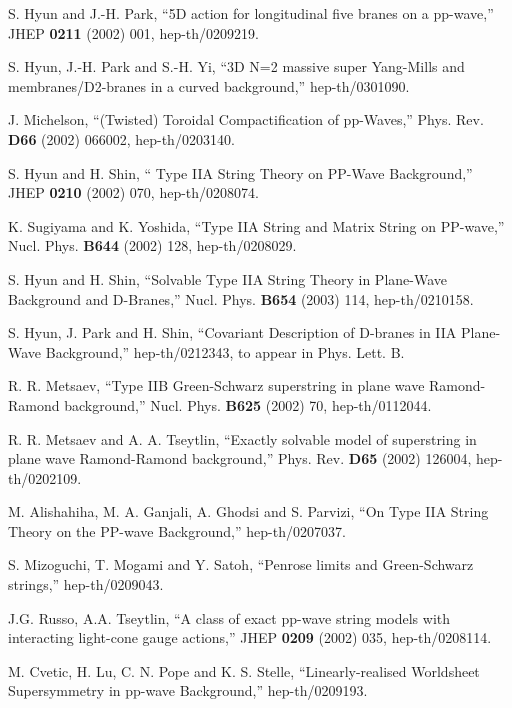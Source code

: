 \documentclass[a4paper,12pt]{article}
\numberwithin{equation}{section}
\begin{document}
\begin{thebibliography}{99}
 S. Hyun and J.-H. Park, ``5D action for longitudinal
  five branes on a pp-wave,'' JHEP {\bf 0211} (2002) 001,
  hep-th/0209219.

 S. Hyun, J.-H. Park and S.-H. Yi, ``3D N=2 massive
  super Yang-Mills and membranes/D2-branes in a curved background,''
  hep-th/0301090.

 J. Michelson, ``(Twisted) Toroidal Compactification
  of pp-Waves,'' Phys. Rev. {\bf D66} (2002) 066002, hep-th/0203140.

 S. Hyun and H. Shin, ``\coordHE{} Type IIA
  String Theory on PP-Wave Background,'' JHEP {\bf 0210} (2002) 070,
  hep-th/0208074.

 K. Sugiyama and K. Yoshida, ``Type IIA String and
  Matrix String on PP-wave,'' Nucl. Phys. {\bf B644} (2002) 128,
  hep-th/0208029.

 S. Hyun and H. Shin, ``Solvable \coordHE{} Type
  IIA String Theory in Plane-Wave Background and D-Branes,'' Nucl.
  Phys.  {\bf B654} (2003) 114, hep-th/0210158.

 S. Hyun, J. Park and H. Shin, ``Covariant Description
  of D-branes in IIA Plane-Wave Background,'' hep-th/0212343, to
  appear in Phys. Lett. B.

 R. R. Metsaev, ``Type IIB Green-Schwarz superstring
  in plane wave Ramond-Ramond background,'' Nucl. Phys.  {\bf B625}
  (2002) 70, hep-th/0112044.

 R. R. Metsaev and A. A. Tseytlin, ``Exactly solvable
  model of superstring in plane wave Ramond-Ramond background,'' Phys.
  Rev. {\bf D65} (2002) 126004, hep-th/0202109.

 M. Alishahiha, M. A. Ganjali, A. Ghodsi and S.
  Parvizi, ``On Type IIA String Theory on the PP-wave Background,''
  hep-th/0207037.

 S. Mizoguchi, T. Mogami and Y. Satoh, ``Penrose
  limits and Green-Schwarz strings,'' hep-th/0209043.

 J.G. Russo, A.A. Tseytlin, ``A class of exact pp-wave
  string models with interacting light-cone gauge actions,'' JHEP {\bf
    0209} (2002) 035, hep-th/0208114.

 M. Cvetic, H. Lu, C. N. Pope and K. S. Stelle,
  ``Linearly-realised Worldsheet Supersymmetry in pp-wave
  Background,'' hep-th/0209193.


\end{thebibliography}
\end{document}
